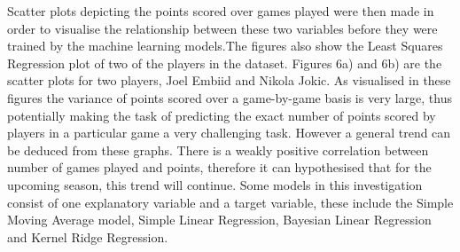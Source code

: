 \documentclass[a4paper,11pt,twoside]{article}
\begin{document}
Scatter plots depicting the points scored over games played were then made in order to visualise the relationship between these two variables before they were trained by the machine learning models.The figures also show the Least Squares Regression plot of two of the players in the dataset. Figures 6a) and 6b) are the scatter plots for two players, Joel Embiid and Nikola Jokic. As visualised in these figures the variance of points scored over a game-by-game basis is very large, thus potentially making the task of predicting the exact number of points scored by players in a particular game a very challenging task. However a general trend can be deduced from these graphs. There is a weakly positive correlation between number of games played and points, therefore it can hypothesised that for the upcoming season, this trend will continue. Some models in this investigation consist of one explanatory variable and a target variable, these include the Simple Moving Average model, Simple Linear Regression, Bayesian Linear Regression and Kernel Ridge Regression.
\end{document}
